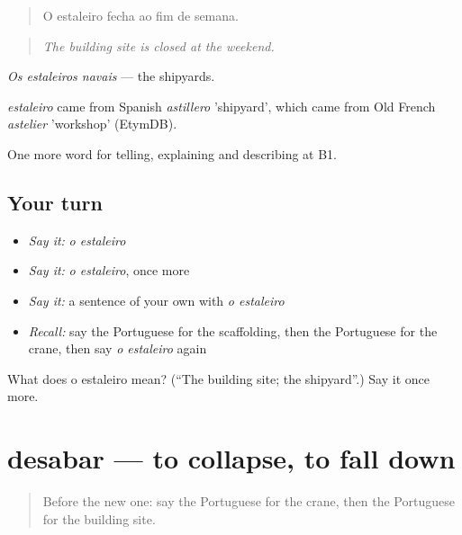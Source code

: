 \begin{quote}
O estaleiro fecha ao fim de semana.
\end{quote}

\begin{quote}
\emph{The building site is closed at the weekend.}
\end{quote}

\emph{Os estaleiros navais} — the shipyards.

\begin{cousinweb}
\emph{estaleiro} came from Spanish \emph{astillero} 'shipyard', which came from Old French \emph{astelier} 'workshop' (EtymDB).
\end{cousinweb}

\begin{grammarlens}[title={What you've built}]
One more word for telling, explaining and describing at B1.
\end{grammarlens}

\subsection*{Your turn}
\begin{itemize}
\raggedright
  \item \emph{Say it:} \emph{o estaleiro}
  \item \emph{Say it:} \emph{o estaleiro}, once more
  \item \emph{Say it:} a sentence of your own with \emph{o estaleiro}
  \item \emph{Recall:} say the Portuguese for the scaffolding, then the Portuguese for the crane, then say \emph{o estaleiro} again
\end{itemize}

\begin{tcolorbox}[breakable,colback=teal!4,colframe=teal!35!black,title={Before you move on}]
What does o estaleiro mean? (\textquotedblleft{}The building site; the shipyard\textquotedblright{}.) Say it once more.
\end{tcolorbox}
\section[desabar]{desabar — to collapse, to fall down}

\label{lesson:PT-C445-desabar}



\begin{quote}
Before the new one: say the Portuguese for the crane, then the Portuguese for the building site.
\end{quote}

